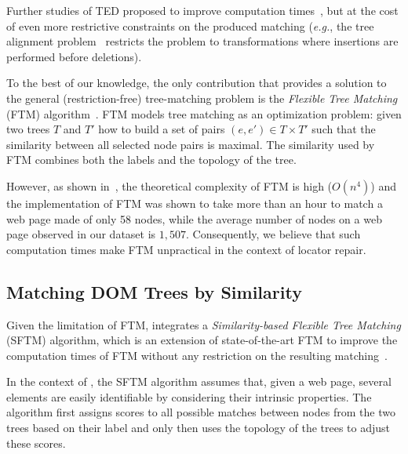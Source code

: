 Further studies of TED proposed to improve computation times~\cite{jiang1995alignment, valiente2001efficient, zhang1996constrained}, but at the cost of even more restrictive constraints on the produced matching (\emph{e.g.}, the tree alignment problem~\cite{jiang1995alignment} restricts the problem to transformations where insertions are performed before deletions).

To the best of our knowledge, the only contribution that provides a solution to the general (restriction-free) tree-matching problem is the \emph{Flexible Tree Matching} (FTM) algorithm~\cite{Kumar2011_FTM}.
FTM models tree matching as an optimization problem: given two trees $T$ and $T'$ how to build a set of pairs $(e,e') \in T \times T'$ such that the similarity between all selected node pairs is maximal.
The similarity used by FTM combines both the labels and the topology of the tree.

However, as shown in~\cite{brisset2020sftm}, the theoretical complexity of FTM is high ($O(n^4)$) and the implementation of FTM was shown to take more than an hour to match a web page made of only 58 nodes, while the average number of nodes on a web page observed in our dataset is $1,507$.
Consequently, we believe that such computation times make FTM unpractical in the context of locator repair.


\subsection{Matching DOM Trees by Similarity}\label{sec:SFTM}
Given the limitation of FTM, \erratum{} integrates a \emph{Similarity-based Flexible Tree Matching} (SFTM) algorithm, which is an extension of state-of-the-art FTM to improve the computation times of FTM without any restriction on the resulting matching~\cite{brisset2020sftm}. 

In the context of \erratum{}, the SFTM algorithm assumes that, given a web page, several elements are easily identifiable by considering their intrinsic properties.
The algorithm first assigns scores to all possible matches between nodes from the two trees based on their label and only then uses the topology of the trees to adjust these scores.

